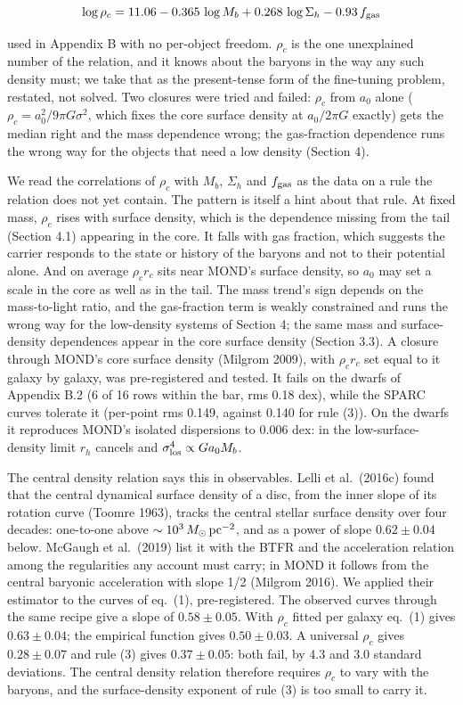 \documentclass[
  10pt,
]{article}
\begin{document}
\begin{equation}
\log\rho_c = 11.06 - 0.365\,\log M_b + 0.268\,\log\Sigma_h - 0.93\,f_{\rm gas}
\end{equation}

used in Appendix B with no per-object freedom. $\rho_c$ is the one unexplained number of the relation, and it knows about the baryons in the way any such density must; we take that as the present-tense form of the fine-tuning problem, restated, not solved. Two closures were tried and failed: $\rho_c$ from $a_0$ alone ($\rho_c=a_0^2/9\pi G\sigma^2$, which fixes the core surface density at $a_0/2\pi G$ exactly) gets the median right and the mass dependence wrong; the gas-fraction dependence runs the wrong way for the objects that need a low density (Section 4).

We read the correlations of $\rho_c$ with $M_b$, $\Sigma_h$ and $f_{\rm gas}$ as the data on a rule the relation does not yet contain. The pattern is itself a hint about that rule. At fixed mass, $\rho_c$ rises with surface density, which is the dependence missing from the tail (Section 4.1) appearing in the core. It falls with gas fraction, which suggests the carrier responds to the state or history of the baryons and not to their potential alone. And on average $\rho_c r_c$ sits near MOND's surface density, so $a_0$ may set a scale in the core as well as in the tail. The mass trend's sign depends on the mass-to-light ratio, and the gas-fraction term is weakly constrained and runs the wrong way for the low-density systems of Section 4; the same mass and surface-density dependences appear in the core surface density (Section 3.3). A closure through MOND's core surface density (Milgrom 2009), with $\rho_c r_c$ set equal to it galaxy by galaxy, was pre-registered and tested. It fails on the dwarfs of Appendix B.2 (6 of 16 rows within the bar, rms 0.18 dex), while the SPARC curves tolerate it (per-point rms 0.149, against 0.140 for rule (3)). On the dwarfs it reproduces MOND's isolated dispersions to 0.006 dex: in the low-surface-density limit $r_h$ cancels and $\sigma_{\rm los}^4 \propto G a_0 M_b$.

The central density relation says this in observables. Lelli et al.~(2016c) found that the central dynamical surface density of a disc, from the inner slope of its rotation curve (Toomre 1963), tracks the central stellar surface density over four decades: one-to-one above $\sim10^3\,M_\odot\,{\rm pc}^{-2}$, and as a power of slope $0.62\pm0.04$ below. McGaugh et al.~(2019) list it with the BTFR and the acceleration relation among the regularities any account must carry; in MOND it follows from the central baryonic acceleration with slope 1/2 (Milgrom 2016). We applied their estimator to the curves of eq.~(1), pre-registered. The observed curves through the same recipe give a slope of $0.58\pm0.05$. With $\rho_c$ fitted per galaxy eq.~(1) gives $0.63\pm0.04$; the empirical function gives $0.50\pm0.03$. A universal $\rho_c$ gives $0.28\pm0.07$ and rule (3) gives $0.37\pm0.05$: both fail, by 4.3 and 3.0 standard deviations. The central density relation therefore requires $\rho_c$ to vary with the baryons, and the surface-density exponent of rule (3) is too small to carry it.
\end{document}
